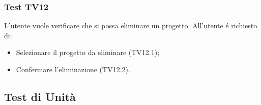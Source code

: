 \subsubsection{Test TV12}
L'utente vuole verificare che si possa eliminare un progetto. \newline
All'utente é richiesto di:
\begin{itemize}
	\item Selezionare il progetto da eliminare (TV12.1);
	\item Confermare l'eliminazione (TV12.2).
\end{itemize}

\newpage
\subsection{Test di Unità}

